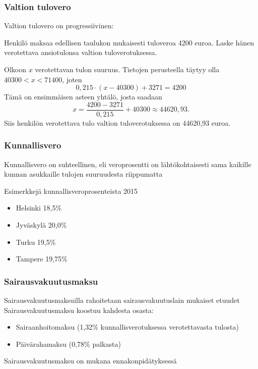 \documentclass[handout]{beamer}
\newcommand{\pblock}{\\ \vspace{0.5cm}\pause}
\begin{document}
\begin{frame}
\frametitle{Valtion tulovero}
\pause
Valtion tulovero on progressiivinen:
	\begin{small}
	    
	\end{small}
\end{frame}


\begin{frame}
	\begin{esim}
		Henkilö maksaa edellisen taulukon mukaisesti tuloveroa 4200 euroa. Laske hänen verotettava ansiotulonsa valtion tuloverotuksessa.
	\end{esim}
	\begin{ratkaisu}
		\pause Olkoon \(x\) verotettavan tulon suuruus. \pause Tietojen perusteella täytyy olla \(40300 < x < 71400\), \pause joten 
		\[
			0,215\cdot(x-40300) + 3271 = 4200
		\]\pause
		Tämä on ensimmäisen asteen yhtälö, josta saadaan \pause
		\[
			x = \frac{4200-3271}{0,215}+40300 \approx 44620,93.
		\] \pause
		Siis henkilön verotettava tulo valtion tuloverotuksessa on 44620,93 euroa.
	\end{ratkaisu}
\end{frame}
\begin{frame}
\frametitle{Kunnallisvero}
\pause
Kunnallisvero on suhteellinen, eli veroprosentti on lähtökohtaisesti sama kaikille kunnan asukkaille tulojen suuruudesta riippumatta
	\begin{block}{Esimerkkejä kunnallisveroprosenteista 2015}
		\begin{itemize}
			\item Helsinki 18,5\% 
			\item Jyväskylä 20,0\%
			\item Turku 19,5\%
			\item Tampere 19,75\%
		\end{itemize}
	\end{block}
\end{frame}

\begin{frame}
\frametitle{Sairausvakuutusmaksu}
\pause
Sairausvakuutusmaksuilla rahoitetaan sairausvakuutuslain mukaiset etuudet 
\pblock
Sairausvakuutusmaksu koostuu kahdesta osasta:
\begin{itemize}
	\item Sairaanhoitomaksu (1,32\%	kunnallisverotuksessa verotettavasta tulosta)
	\item Päivärahamaksu (0,78\% palkasta)
	\pblock
\end{itemize}
Sairausvakuutusmaksu on mukana ennakonpidätyksessä
\end{frame}
\end{document}
